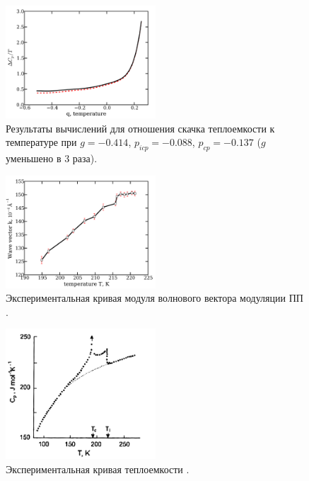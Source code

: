 \begin{figure}\label{fig:g!3-cpt}
\includegraphics[width = 0.5\textwidth]{figs/g_3-cpt.pdf}
\caption{Результаты вычислений для отношения скачка теплоемкости к температуре при $g= -0.414$, $p_{icp}= -0.088$, $p_{cp}=-0.137$ ($g$ уменьшено в 3 раза).}
\end{figure}

\begin{figure}\label{fig:exp-wn}
\includegraphics[width = 0.5\textwidth]{figs/exp-wn.pdf}
\caption{Экспериментальная кривая модуля волнового вектора модуляции ПП \protect\cite{Khoma1998}.}
\end{figure}

\begin{figure}\label{fig:exp-cp}
\includegraphics[width = 0.5\textwidth]{figs/exp-cp.pdf}
\caption{Экспериментальная кривая теплоемкости \protect\cite{Khoma1998}.}
\end{figure}